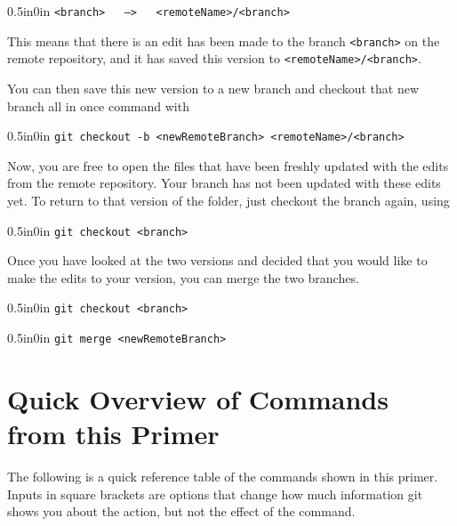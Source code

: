 \documentclass[11pt]{article}
\newcommand{\code}[1]{\begin{adjustwidth}{0.5in}{0in}
    \texttt{#1}
    \end{adjustwidth}}
\begin{document}
\code{<branch> \ \ --> \ \ <remoteName>/<branch>}

This means that there is an edit has been made to the branch \texttt{<branch>} on the remote repository, and it has saved this version to \texttt{<remoteName>/<branch>}.

You can then save this new version to a new branch and checkout that new branch all in once command with

\code{git checkout -b <newRemoteBranch> <remoteName>/<branch>}

Now, you are free to open the files that have been freshly updated with the edits from the remote repository.  Your branch has not been updated with these edits yet.  To return to that version of the folder, just checkout the branch again, using
\code{git checkout <branch>}

Once you have looked at the two versions and decided that you would like to make the edits to your version, you can merge the two branches.  

\code{git checkout <branch>}
\code{git merge <newRemoteBranch>}

\newpage
\section{Quick Overview of Commands from this Primer}
The following is a quick reference table of the commands shown in this primer.  Inputs in square brackets are options that change how much information git shows you about the action, but not the effect of the command.
\end{document}
